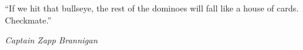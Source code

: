 
\clearpage

\null\vfill


\vspace*{4mm}

\enquote{If we hit that bullseye, the rest of the dominoes will fall like a house of cards. Checkmate.}
\begin{flushright} \emph{Captain Zapp Brannigan} \end{flushright}




\vfill\vfill


